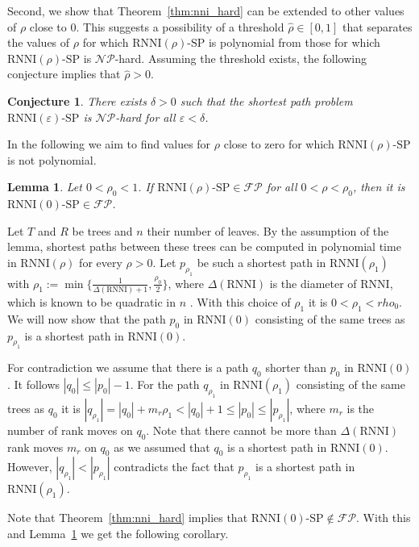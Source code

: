 \documentclass[11pt]{amsart}
\newtheorem{lemma}{Lemma}
\newtheorem{conjecture}{Conjecture}
\newcommand{\rnni}{\mathrm{RNNI}}
\newcommand{\fpc}{\mathcal{FP}}
\newcommand{\np}{\mathcal{NP}}
\newcommand{\decprob}[1]{\rnni(#1)\text{-}\mathrm{SP}}
\renewcommand{\epsilon}{\varepsilon}
\begin{document}
Second, we show that Theorem~\ref{thm:nni_hard} can be extended to other values of $\rho$ close to $0$.
This suggests a possibility of a threshold $\hat\rho \in [0, 1]$ that separates the values of $\rho$ for which $\decprob{\rho}$ is polynomial from those for which $\decprob{\rho}$ is $\np$-hard.
Assuming the threshold exists, the following conjecture implies that $\hat\rho > 0$.

\begin{conjecture}
There exists $\delta > 0$ such that the shortest path problem $\decprob{\epsilon}$ is $\np$-hard for all $\epsilon < \delta$.
\label{prop:complexity_around_nni}
\end{conjecture}

In the following we aim to find values for $\rho$ close to zero for which $\decprob{\rho}$ is not polynomial.

\begin{lemma}
Let $0 < \rho_0 < 1$.
If $\decprob{\rho} \in \fpc$ for all $0<\rho<\rho_0$, then it is ${\decprob{0} \in \fpc}$.
\label{lemma:if_decprob_poly}
\end{lemma}

\proof
Let $T$ and $R$ be trees and $n$ their number of leaves.
By the assumption of the lemma, shortest paths between these trees can be computed in polynomial time in $\rnni(\rho)$ for every $\rho > 0$.
Let $p_{\rho_1}$ be such a shortest path in $\rnni(\rho_1)$ with $\rho_1 := \min\{\frac{1}{\Delta(\rnni) + 1}, \frac{\rho_0}{2}\}$, where $\Delta(\rnni)$ is the diameter of $\rnni$, which is known to be quadratic in $n$ \autocite{Gavryushkin2018-ol}.
With this choice of $\rho_1$ it is $0 < \rho_1 < rho_0$.
We will now show that the path $p_0$ in $\rnni(0)$ consisting of the same trees as $p_{\rho_1}$ is a shortest path in $\rnni(0)$.

For contradiction we assume that there is a path $q_0$ shorter than $p_0$ in $\rnni(0)$.
It follows $|q_0| \leq |p_0| - 1$.
For the path $q_{\rho_1}$ in $\rnni(\rho_1)$ consisting of the same trees as $q_0$ it is $|q_{\rho_1}| = |q_0| + m_r \rho_1 < |q_0| + 1 \leq |p_0| \leq |p_{\rho_1}|$, where $m_r$ is the number of rank moves on $q_0$.
Note that there cannot be more than $\Delta(\rnni)$ rank moves $m_r$ on $q_0$ as we assumed that $q_0$ is a shortest path in $\rnni(0)$.
However, $|q_{\rho_1}| < |p_{\rho_1}|$ contradicts the fact that $p_{\rho_1}$ is a shortest path in $\rnni(\rho_1)$.
\endproof

Note that Theorem~\ref{thm:nni_hard} implies that $\decprob{0} \notin \fpc$.
With this and Lemma~\ref{lemma:if_decprob_poly} we get the following corollary.
\end{document}

